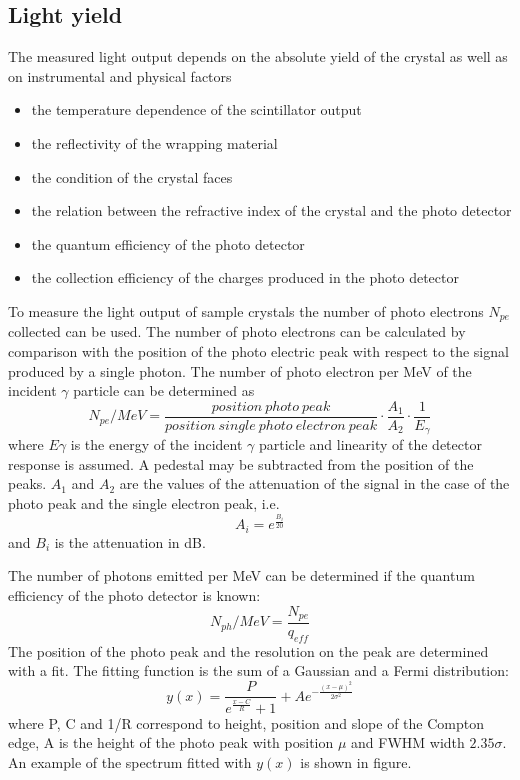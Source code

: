 \subsection{Light yield}
The measured light output depends on the absolute yield of the crystal as well as on instrumental and physical factors
\begin{itemize}
\item the temperature dependence of the scintillator output
\item the reflectivity of the wrapping material
\item the condition of the crystal faces
\item the relation between the refractive index of the crystal and the photo detector
\item the quantum efficiency of the photo detector
\item the collection efficiency of the charges produced in the photo detector
\end{itemize}
To measure the light output of sample crystals the number of photo electrons $N_{pe}$ collected can be used.
The number of photo electrons can be calculated by comparison with the position of the photo electric peak with respect to the signal produced by a single photon. The number of photo electron per MeV of the incident $\gamma$ particle can be determined as
\begin{equation}
N_{pe}/MeV=\frac{position\ photo\ peak}{position\ single\ photo\ electron\ peak} \cdot \frac{A_{1}}{A_{2}} \cdot \frac{1}{E_{\gamma}}
\end{equation}
where $E\gamma$ is the energy of the incident $\gamma$ particle and linearity of the detector response is assumed. A pedestal may be subtracted from the position of the peaks. $A_{1}$ and $A_{2}$ are the values of the attenuation of the signal in the case of the photo peak and the single electron peak, i.e.
\begin{equation}
A_{i}=e^{\frac{B_{i}}{20}}
\end{equation}
and $B_{i}$ is the attenuation in dB.

The number of photons emitted per MeV can be determined if the quantum efficiency of the photo detector is known:
\begin{equation}
N_{ph}/MeV=\frac{N_{pe}}{q_{eff}}
\end{equation}
The position of the photo peak and the resolution on the peak are determined with a fit. The fitting function is the sum of a Gaussian and a Fermi distribution:
\begin{equation}
y(x)=\frac{P}{e^{\frac{x-C}{R}}+1}+Ae^{-\frac{(x-\mu)^{2}}{2\sigma ^{2}}}
\end{equation}
where P, C and 1/R correspond to height, position and slope of the Compton edge, A is the height of the photo peak with position $\mu$ and FWHM width $2.35\sigma$. An example of the spectrum fitted with $y(x)$ is shown in figure.


